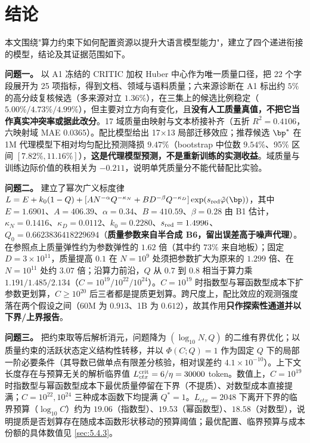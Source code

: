 \section{结论}
\label{sec:8}

本文围绕"算力约束下如何配置资源以提升大语言模型能力"，建立了四个递进衔接的模型，结论及其证据范围如下。

\textbf{问题一。} 以 A1 冻结的 CRITIC 加权 Huber 中心作为唯一质量口径，把 22 个字段展开为 25 项指标，得到文档、领域与语料质量；六来源诊断在 A1 标出约 $5\%$ 的高分歧复核候选（多来源对立 $1.36\%$），在三集上的候选比例稳定（$5.00\%/4.73\%/4.99\%$），但主要对立方向有变化，且\textbf{没有人工质量真值，不把它当作真实冲突率或据此改分}。17 域质量由映射与文本桥接补齐（五折 $R^2=0.4106$，六映射域 MAE $0.0365$）。配比模型给出 17$\times$13 局部迁移效应；推荐候选 $\bp^*$ 在 1M 代理模型下相对均匀配比预测降损 $9.47\%$（bootstrap 中位数 $9.54\%$、95\% 区间 $[7.82\%,11.16\%]$），\textbf{这是代理模型预测，不是重新训练的实测收益}。域质量与训练边际价值的秩相关为 $-0.211$，说明单凭质量分不能代替配比实验。

\textbf{问题二。} 建立了幂次广义标度律 $L=E+k_0(1-Q)+[AN^{-\alpha}Q^{-\kappa_N}+BD^{-\beta}Q^{-\kappa_D}]\exp(s_{\rm red}\tilde\varphi(\bp))$，其中 $E=1.6901$、$A=406.39$、$\alpha=0.34$、$B=410.59$、$\beta=0.28$ 由 B1 估计，$\kappa_N=0.1416$、$\kappa_D=0.0112$、$k_0=0.2280$、$s_{\rm red}=1.4996$、$Q_0=0.6623836418229694$（\textbf{质量参数来自半合成 B6，留出误差高于噪声代理}）。在参照点上质量弹性约为参数弹性的 $1.62$ 倍（其中约 $73\%$ 来自地板）；固定 $D=3\times10^{11}$，质量提高 $0.1$ 在 $N=10^9$ 处须把参数扩大为原来的 $1.299$ 倍、在 $N=10^{11}$ 处约 $3.07$ 倍；沿算力前沿，$Q$ 从 $0.7$ 到 $0.8$ 相当于算力乘 $1.191/1.485/2.134$（$C=10^{19}/10^{22}/10^{24}$）。$C=10^{19}$ 时指数型与幂函数型成本下扩参数更划算，$C\ge10^{20}$ 后三者都是提质更划算。跨尺度上，配比效应的观测强度落在两个假设之间（60M 为 $0.913$、1B 为 $0.612$），故其作用\textbf{只作探索性通道并以下界/上界报告}。

\textbf{问题三。} 把约束取等后解析消元，问题降为 $(\log_{10}N,Q)$ 的二维有界优化；以质量约束的活跃状态定义结构性转移，并以 $\Phi(C;Q)=1$ 作为固定 $Q$ 下的局部一阶必要条件（其导数已做单点有限差分核验，相对误差约 $4.1\times10^{-10}$）。上下文长度存在与预算无关的解析临界值 $L_{ctx}^{\rm crit}=6/\eta=30000$ token。数值上，$C=10^{19}$ 时指数型与幂函数型成本下最优质量停留在下界（不提质）、对数型成本直接提满；$C=10^{22},10^{24}$ 三种成本函数下均提满 $Q^*=1$。$L_{ctx}=2048$ 下离开下界的临界预算（$\log_{10}C$）约为 $19.06$（指数型）、$19.53$（幂函数型）、$18.58$（对数型），说明提质是否划算存在随成本函数形状移动的预算阈值；最优配置、临界预算与成本份额的具体数值见 \ref{sec:5.4.3}。


